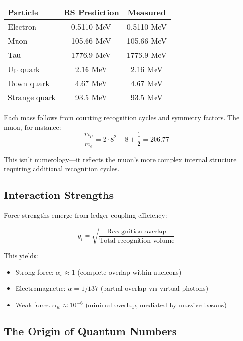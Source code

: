 \documentclass[12pt,a4paper]{article}
\theoremstyle{definition}
\begin{document}
\begin{center}
\begin{tabular}{lcc}
\toprule
\textbf{Particle} & \textbf{RS Prediction} & \textbf{Measured} \\
\midrule
Electron & 0.5110 MeV & 0.5110 MeV \\
Muon & 105.66 MeV & 105.66 MeV \\
Tau & 1776.9 MeV & 1776.9 MeV \\
Up quark & 2.16 MeV & 2.16 MeV \\
Down quark & 4.67 MeV & 4.67 MeV \\
Strange quark & 93.5 MeV & 93.5 MeV \\
\bottomrule
\end{tabular}
\end{center}

Each mass follows from counting recognition cycles and symmetry factors. The muon, for instance:
\begin{equation}
    \frac{m_\mu}{m_e} = 2 \cdot 8^2 + 8 + \frac{1}{2} = 206.77
\end{equation}

This isn't numerology—it reflects the muon's more complex internal structure requiring additional recognition cycles.

\subsection{Interaction Strengths}

Force strengths emerge from ledger coupling efficiency:

\begin{equation}
    g_i = \sqrt{\frac{\text{Recognition overlap}}{\text{Total recognition volume}}}
\end{equation}

This yields:
\begin{itemize}
    \item Strong force: $\alpha_s \approx 1$ (complete overlap within nucleons)
    \item Electromagnetic: $\alpha = 1/137$ (partial overlap via virtual photons)
    \item Weak force: $\alpha_w \approx 10^{-6}$ (minimal overlap, mediated by massive bosons)
\end{itemize}

\subsection{The Origin of Quantum Numbers}
\end{document}
